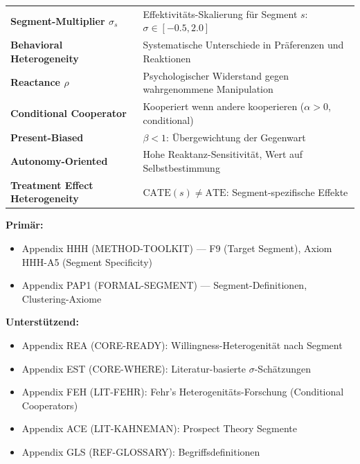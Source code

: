 \begin{tcolorbox}[colback=blue!5!white, colframe=blue!75!black,
    title=Zentrale Begriffe in diesem Kapitel]
\small
\begin{tabular}{@{}ll@{}}
\textbf{Segment-Multiplier $\sigma_s$} & Effektivitäts-Skalierung für Segment $s$: $\sigma \in [-0.5, 2.0]$ \\
\textbf{Behavioral Heterogeneity} & Systematische Unterschiede in Präferenzen und Reaktionen \\
\textbf{Reactance $\rho$} & Psychologischer Widerstand gegen wahrgenommene Manipulation \\
\textbf{Conditional Cooperator} & Kooperiert wenn andere kooperieren ($\alpha > 0$, conditional) \\
\textbf{Present-Biased} & $\beta < 1$: Übergewichtung der Gegenwart \\
\textbf{Autonomy-Oriented} & Hohe Reaktanz-Sensitivität, Wert auf Selbstbestimmung \\
\textbf{Treatment Effect Heterogeneity} & $\text{CATE}(s) \neq \text{ATE}$: Segment-spezifische Effekte \\
\end{tabular}
\end{tcolorbox}

\begin{tcolorbox}[colback=yellow!10!white, colframe=orange!75!black,
    title=Appendix References for This Chapter]

\textbf{Primär:}
\begin{itemize}[nosep]
\item Appendix HHH (METHOD-TOOLKIT) --- F9 (Target Segment), Axiom HHH-A5 (Segment Specificity)
\item Appendix PAP1 (FORMAL-SEGMENT) --- Segment-Definitionen, Clustering-Axiome
\end{itemize}

\textbf{Unterstützend:}
\begin{itemize}[nosep]
\item Appendix REA (CORE-READY): Willingness-Heterogenität nach Segment
\item Appendix EST (CORE-WHERE): Literatur-basierte $\sigma$-Schätzungen
\item Appendix FEH (LIT-FEHR): Fehr's Heterogenitäts-Forschung (Conditional Cooperators)
\item Appendix ACE (LIT-KAHNEMAN): Prospect Theory Segmente
\item Appendix GLS (REF-GLOSSARY): Begriffsdefinitionen
\end{itemize}
\end{tcolorbox}

